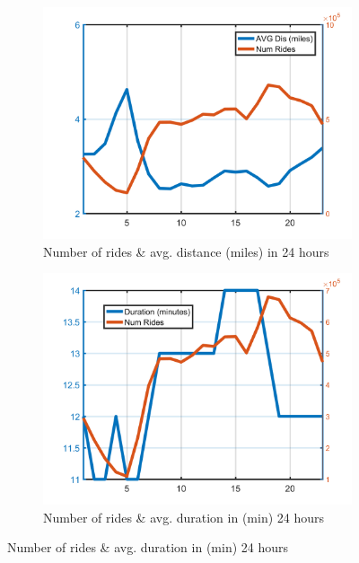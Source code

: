\documentclass{article}
\begin{document}
\begin{figure}[H]
\centering
\begin{subfigure}{.5\linewidth}
  \centering
  \includegraphics[width=.8\linewidth]{numride_tod}
  \caption{Number of rides \& avg. distance (miles) in 24 hours}
  \label{fig:sub1}
\end{subfigure}%
\begin{subfigure}{.5\linewidth}
  \centering
  \includegraphics[width=.8\linewidth]{numride_tod_dur}
  \caption{Number of rides \& avg. duration in (min) 24 hours}
  \label{fig:sub2}
\end{subfigure}


\end{figure}
\end{document}

